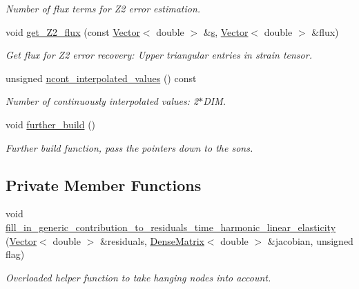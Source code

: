 \begin{DoxyCompactItemize}
\begin{DoxyCompactList}\small\item\em Number of \textquotesingle{}flux\textquotesingle{} terms for Z2 error estimation. \end{DoxyCompactList}\item 
void \hyperlink{classoomph_1_1RefineableTimeHarmonicLinearElasticityEquations_a04b7ef358d9598ddece9cbd961b6f956}{get\+\_\+\+Z2\+\_\+flux} (const \hyperlink{classoomph_1_1Vector}{Vector}$<$ double $>$ \&\hyperlink{cfortran_8h_ab7123126e4885ef647dd9c6e3807a21c}{s}, \hyperlink{classoomph_1_1Vector}{Vector}$<$ double $>$ \&flux)
\begin{DoxyCompactList}\small\item\em Get \textquotesingle{}flux\textquotesingle{} for Z2 error recovery\+: Upper triangular entries in strain tensor. \end{DoxyCompactList}\item 
unsigned \hyperlink{classoomph_1_1RefineableTimeHarmonicLinearElasticityEquations_a00935c8f08aaa87a054a55b901d47dad}{ncont\+\_\+interpolated\+\_\+values} () const
\begin{DoxyCompactList}\small\item\em Number of continuously interpolated values\+: 2$\ast$\+D\+IM. \end{DoxyCompactList}\item 
void \hyperlink{classoomph_1_1RefineableTimeHarmonicLinearElasticityEquations_a750d40e1fd9377cd428dfe599bf93a84}{further\+\_\+build} ()
\begin{DoxyCompactList}\small\item\em Further build function, pass the pointers down to the sons. \end{DoxyCompactList}\end{DoxyCompactItemize}
\subsection*{Private Member Functions}
\begin{DoxyCompactItemize}
\item 
void \hyperlink{classoomph_1_1RefineableTimeHarmonicLinearElasticityEquations_aee2ee5553f02fbb360115bf2e389b8b1}{fill\+\_\+in\+\_\+generic\+\_\+contribution\+\_\+to\+\_\+residuals\+\_\+time\+\_\+harmonic\+\_\+linear\+\_\+elasticity} (\hyperlink{classoomph_1_1Vector}{Vector}$<$ double $>$ \&residuals, \hyperlink{classoomph_1_1DenseMatrix}{Dense\+Matrix}$<$ double $>$ \&jacobian, unsigned flag)
\begin{DoxyCompactList}\small\item\em Overloaded helper function to take hanging nodes into account. \end{DoxyCompactList}\end{DoxyCompactItemize}
